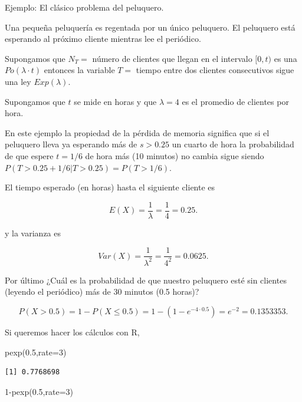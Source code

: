 \documentclass[
  letterpaper,
  DIV=11,
  numbers=noendperiod]{scrreprt}
\newenvironment{Shaded}{\begin{snugshade}}{\end{snugshade}}
\newcommand{\AttributeTok}[1]{\textcolor[rgb]{0.40,0.45,0.13}{#1}}
\newcommand{\DecValTok}[1]{\textcolor[rgb]{0.68,0.00,0.00}{#1}}
\newcommand{\FloatTok}[1]{\textcolor[rgb]{0.68,0.00,0.00}{#1}}
\newcommand{\FunctionTok}[1]{\textcolor[rgb]{0.28,0.35,0.67}{#1}}
\newcommand{\NormalTok}[1]{\textcolor[rgb]{0.00,0.23,0.31}{#1}}
\newcommand{\SpecialCharTok}[1]{\textcolor[rgb]{0.37,0.37,0.37}{#1}}
\begin{document}
\begin{Ejemplo}{Ejemplo: El clásico problema del peluquero.}{}

Una pequeña peluquería es regentada por un único peluquero. El peluquero
está esperando al próximo cliente mientras lee el periódico.

Supongamos que \(N_T=\) número de clientes que llegan en el intervalo
\([0,t)\) es una \(Po(\lambda\cdot t)\) entonces la variable \(T=\)
tiempo entre dos clientes consecutivos sigue una ley \(Exp(\lambda)\).

Supongamos que \(t\) se mide en horas y que \(\lambda=4\) es el promedio
de clientes por hora.

En este ejemplo la propiedad de la pérdida de memoria significa que si
el peluquero lleva ya esperando más de \(s>0.25\) un cuarto de hora la
probabilidad de que espere \(t=1/6\) de hora más (10 minutos) no cambia
sigue siendo \(P(T>0.25+1/6|T>0.25)=P(T>1/6).\)

El tiempo esperado (en horas) hasta el siguiente cliente es

\[
E(X)=\frac{1}{\lambda}=\frac{1}{4}=0.25.
\]

y la varianza es

\[
Var(X)=\frac{1}{\lambda^2}=\frac{1}{4^2}=0.0625.
\]

Por último ¿Cuál es la probabilidad de que nuestro peluquero esté sin
clientes (leyendo el periódico) más de 30 minutos (0.5 horas)?

\[
P(X>0.5)=1-P(X\leq 0.5)=1-(1-e^{-4\cdot 0.5 })=e^{-2}=0.1353353.
\]

Si queremos hacer los cálculos con R,

\begin{Shaded}
\begin{Highlighting}[]
\FunctionTok{pexp}\NormalTok{(}\FloatTok{0.5}\NormalTok{,}\AttributeTok{rate=}\DecValTok{3}\NormalTok{)}
\end{Highlighting}
\end{Shaded}

\begin{verbatim}
[1] 0.7768698
\end{verbatim}

\begin{Shaded}
\begin{Highlighting}[]
\DecValTok{1}\SpecialCharTok{{-}}\FunctionTok{pexp}\NormalTok{(}\FloatTok{0.5}\NormalTok{,}\AttributeTok{rate=}\DecValTok{3}\NormalTok{)}
\end{Highlighting}
\end{Shaded}


\end{Ejemplo}
\end{document}
